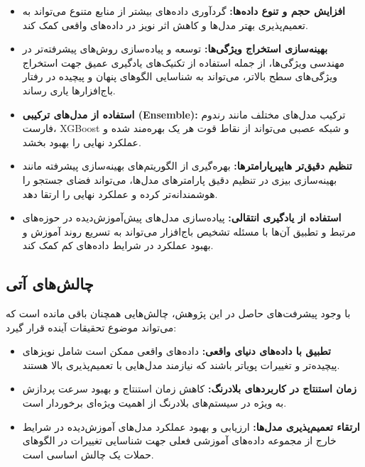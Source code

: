 \begin{itemize}
    \item \textbf{افزایش حجم و تنوع داده‌ها:} گردآوری داده‌های بیشتر از منابع متنوع می‌تواند به تعمیم‌پذیری بهتر مدل‌ها و کاهش اثر نویز در داده‌های واقعی کمک کند.
    \item \textbf{بهینه‌سازی استخراج ویژگی‌ها:} توسعه و پیاده‌سازی روش‌های پیشرفته‌تر در مهندسی ویژگی‌ها، از جمله استفاده از تکنیک‌های یادگیری عمیق جهت استخراج ویژگی‌های سطح بالاتر، می‌تواند به شناسایی الگوهای پنهان و پیچیده در رفتار باج‌افزارها یاری رساند.
    \item \textbf{استفاده از مدل‌های ترکیبی (Ensemble):} ترکیب مدل‌های مختلف مانند رندوم فارست، XGBoost و شبکه عصبی می‌تواند از نقاط قوت هر یک بهره‌مند شده و عملکرد نهایی را بهبود بخشد.
    \item \textbf{تنظیم دقیق‌تر هایپرپارامترها:} بهره‌گیری از الگوریتم‌های بهینه‌سازی پیشرفته مانند بهینه‌سازی بیزی در تنظیم دقیق پارامترهای مدل‌ها، می‌تواند فضای جستجو را هوشمندانه‌تر کرده و عملکرد نهایی را ارتقا دهد.
    \item \textbf{استفاده از یادگیری انتقالی:} پیاده‌سازی مدل‌های پیش‌آموزش‌دیده در حوزه‌های مرتبط و تطبیق آن‌ها با مسئله تشخیص باج‌افزار می‌تواند به تسریع روند آموزش و بهبود عملکرد در شرایط داده‌های کم کمک کند.
\end{itemize}

\subsection{چالش‌های آتی}
با وجود پیشرفت‌های حاصل در این پژوهش، چالش‌هایی همچنان باقی مانده است که می‌تواند موضوع تحقیقات آینده قرار گیرد:
\begin{itemize}
    \item \textbf{تطبیق با داده‌های دنیای واقعی:} داده‌های واقعی ممکن است شامل نویزهای پیچیده‌تر و تغییرات پویاتر باشند که نیازمند مدل‌هایی با تعمیم‌پذیری بالا هستند.
    \item \textbf{زمان استنتاج در کاربردهای بلادرنگ:} کاهش زمان استنتاج و بهبود سرعت پردازش به ویژه در سیستم‌های بلادرنگ از اهمیت ویژه‌ای برخوردار است.
    \item \textbf{ارتقاء تعمیم‌پذیری مدل‌ها:} ارزیابی و بهبود عملکرد مدل‌های آموزش‌دیده در شرایط خارج از مجموعه داده‌های آموزشی فعلی جهت شناسایی تغییرات در الگوهای حملات یک چالش اساسی است.
\end{itemize}

